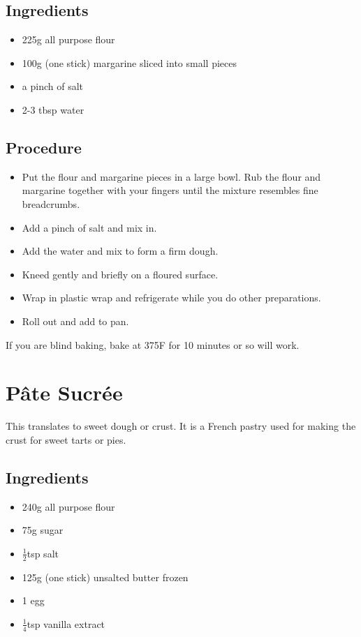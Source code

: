 \documentclass[10pt, openany]{book}
\begin{document}
\subsection{Ingredients}
\begin{itemize}
  \item 225g all purpose flour
  \item 100g (one stick) margarine sliced into small pieces
  \item a pinch of salt
  \item 2-3 tbsp water
\end{itemize}
\subsection{Procedure}
\begin{itemize}
  \item Put the flour and margarine pieces in a large bowl.  Rub the flour and margarine together with your fingers until the mixture resembles fine breadcrumbs.
  \item Add a pinch of salt and mix in.
  \item Add the water and mix to form a firm dough.
  \item Kneed gently and briefly on a floured surface.
  \item Wrap in plastic wrap and refrigerate while you do other preparations.
  \item Roll out and add to pan.
\end{itemize}
If you are blind baking, bake at 375\degree{}F for 10 minutes or so will work.

\section{P\^ate Sucr\'ee}
\label{pie:PateSucree}
This translates to sweet dough or crust.  It is a French pastry used for making the crust for sweet tarts or pies.
\subsection{Ingredients}
\begin{itemize}
  \item 240g all purpose flour
  \item 75g sugar
  \item $\frac{1}{2}$tsp salt
  \item 125g (one stick) unsalted butter frozen
  \item 1 egg
  \item $\frac{1}{4}$tsp vanilla extract
\end{itemize}
\end{document}
